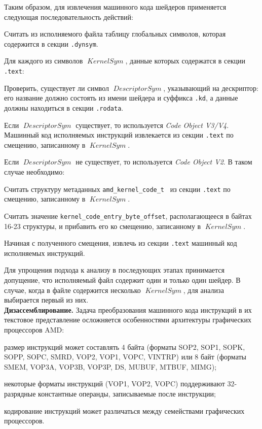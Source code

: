 \documentclass[a4paper,14pt]{extarticle}
\newcommand{\topic}[1]{\textbf{#1.}}
\newcommand{\var}[1]{\mathop{\mathit{#1}}}
\begin{document}
{Таким образом, для извлечения машинного кода шейдеров применяется следующая последовательность действий:
\begin{ol}
\item Считать из исполняемого файла таблицу глобальных символов, которая содержится в секции \verb|.dynsym|.
\item Для каждого из символов $\var{KernelSym}$, данные которых содержатся в секции \verb|.text|:
  \begin{ol}
  \item Проверить, существует ли символ $\var{DescriptorSym}$, указывающий на дескриптор: его название должно состоять
    из имени шейдера и суффикса \verb|.kd|, а данные должны находиться в секции \verb|.rodata|.
  \item Если $\var{DescriptorSym}$ существует, то используется \textit{Code Object V3/V4}. Машинный код исполняемых
    инструкций извлекается из секции \verb|.text| по смещению, записанному в $\var{KernelSym}$.
  \item Если $\var{DescriptorSym}$ не существует, то используется \textit{Code Object V2}. В таком случае необходимо:
    \begin{ul}
    \item Считать структуру метаданных \verb|amd_kernel_code_t|~\cite{amdgpu-abi}
      из секции \verb|.text| по смещению, записанному в $\var{KernelSym}$.
    \item Считать значение \verb|kernel_code_entry_byte_offset|, располагающееся в байтах 16-23 структуры,
      и прибавить его ко смещению, записанному в $\var{KernelSym}$.
    \item Начиная с полученного смещения, извлечь из секции \verb|.text| машинный код исполняемых инструкций.
    \end{ul}
  \end{ol}
\end{ol}

Для упрощения подхода к анализу в последующих этапах принимается допущение,
что исполняемый файл содержит один и только один шейдер. В случае, когда в файле содержится несколько
$\var{KernelSym}$, для анализа выбирается первый из них.\\

\topic{Дизассемблирование} Задача преобразования машинного кода инструкций в их текстовое представление
осложняется особенностями архитектуры графических процессоров AMD:
\begin{ul}
\item размер инструкций может составлять 4 байта (форматы SOP2, SOP1, SOPK, SOPP, SOPC, SMRD, VOP2, VOP1, VOPC, VINTRP)
  или 8 байт (форматы SMEM, VOP3A, VOP3B, VOP3P, DS, MUBUF, MTBUF, MIMG);
\item некоторые форматы инструкций (VOP1, VOP2, VOPC) поддерживают 32-разрядные константные операнды,
  записываемые после инструкции;
\item кодирование инструкций может различаться между семействами графических процессоров.
\end{ul}

}
\end{document}
